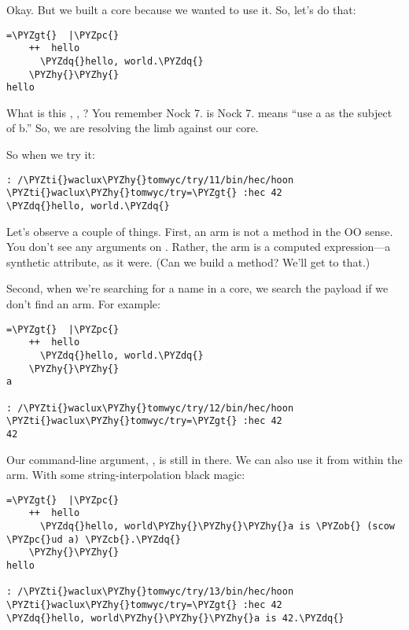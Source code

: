 Okay.  But we built a core because we wanted to use it.  So,
let's do that:
\begin{framed_shaded}
\begin{Verbatim}[fontsize=\relsize{-2.5},fontseries=b,commandchars=\\\{\}]
=\PYZgt{}  |\PYZpc{}
    ++  hello
      \PYZdq{}hello, world.\PYZdq{}
    \PYZhy{}\PYZhy{}
hello
\end{Verbatim}
\end{framed_shaded}

What is this \kode{=\textgreater{}}, , ?  You remember Nock 7.  \kode{=\textgreater{}}
is Nock 7.   means ``use a as the subject of b.''  So, we
are resolving the limb  against our  core.

So when we try it:

\begin{framed_shaded}
\begin{Verbatim}[fontsize=\relsize{-2.5},fontseries=b,commandchars=\\\{\}]
: /\PYZti{}waclux\PYZhy{}tomwyc/try/11/bin/hec/hoon
\PYZti{}waclux\PYZhy{}tomwyc/try=\PYZgt{} :hec 42
\PYZdq{}hello, world.\PYZdq{}
\end{Verbatim}
\end{framed_shaded}
Let's observe a couple of things.  First, an arm is not a method
in the OO sense.  You don't see any arguments on .
Rather, the arm is a computed expression---a synthetic attribute,
as it were.  (Can we build a method?  We'll get to that.)

Second, when we're searching for a name in a core, we search the
payload if we don't find an arm.  For example:
\begin{framed_shaded}
\begin{Verbatim}[fontsize=\relsize{-2.5},fontseries=b,commandchars=\\\{\}]
=\PYZgt{}  |\PYZpc{}
    ++  hello
      \PYZdq{}hello, world.\PYZdq{}
    \PYZhy{}\PYZhy{}
a

: /\PYZti{}waclux\PYZhy{}tomwyc/try/12/bin/hec/hoon
\PYZti{}waclux\PYZhy{}tomwyc/try=\PYZgt{} :hec 42
42
\end{Verbatim}
\end{framed_shaded}

Our command-line argument, , is still in there.  We can also
use it from within the arm.  With some string-interpolation black
magic:
\begin{framed_shaded}
\begin{Verbatim}[fontsize=\relsize{-2.5},fontseries=b,commandchars=\\\{\}]
=\PYZgt{}  |\PYZpc{}
    ++  hello
      \PYZdq{}hello, world\PYZhy{}\PYZhy{}\PYZhy{}a is \PYZob{} (scow \PYZpc{}ud a) \PYZcb{}.\PYZdq{}
    \PYZhy{}\PYZhy{}
hello

: /\PYZti{}waclux\PYZhy{}tomwyc/try/13/bin/hec/hoon
\PYZti{}waclux\PYZhy{}tomwyc/try=\PYZgt{} :hec 42
\PYZdq{}hello, world\PYZhy{}\PYZhy{}\PYZhy{}a is 42.\PYZdq{}
\end{Verbatim}
\end{framed_shaded}

